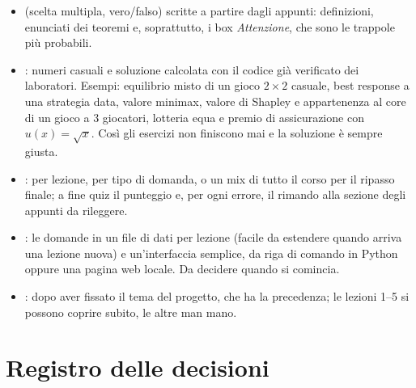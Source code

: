 \documentclass[11pt, a4paper, oneside, openany]{book}
\begin{document}
\begin{itemize}
  \item {} (scelta multipla, vero/falso) scritte a partire dagli
        appunti: definizioni, enunciati dei teoremi e, soprattutto, i box \emph{Attenzione},
        che sono le trappole più probabili.
  \item {}: numeri casuali e soluzione calcolata con il codice già
        verificato dei laboratori. Esempi: equilibrio misto di un gioco $2\times2$ casuale,
        best response a una strategia data, valore minimax, valore di Shapley e appartenenza
        al core di un gioco a 3 giocatori, lotteria equa e premio di assicurazione con
        $u(x)=\sqrt{x}$. Così gli esercizi non finiscono mai e la soluzione è sempre giusta.
  \item {}: per lezione, per tipo di domanda, o un mix di tutto il corso per il
        ripasso finale; a fine quiz il punteggio e, per ogni errore, il rimando alla sezione
        degli appunti da rileggere.
  \item {}: le domande in un file di dati per lezione (facile da estendere
        quando arriva una lezione nuova) e un'interfaccia semplice, da riga di comando in
        Python oppure una pagina web locale. Da decidere quando si comincia.
  \item {}: dopo aver fissato il tema del progetto, che ha la precedenza; le
        lezioni 1--5 si possono coprire subito, le altre man mano.
\end{itemize}

\section{Registro delle decisioni}
\end{document}
